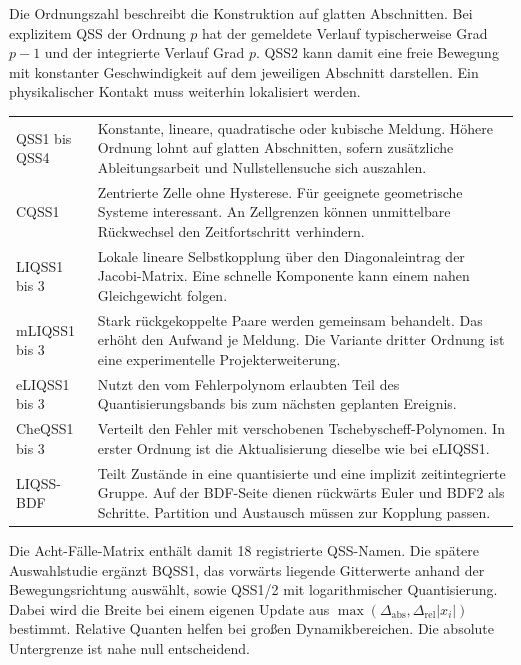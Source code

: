 Die Ordnungszahl beschreibt die Konstruktion auf glatten Abschnitten. Bei explizitem QSS der Ordnung \(p\) hat der gemeldete Verlauf typischerweise Grad \(p-1\) und der integrierte Verlauf Grad \(p\). QSS2 kann damit eine freie Bewegung mit konstanter Geschwindigkeit auf dem jeweiligen Abschnitt darstellen. Ein physikalischer Kontakt muss weiterhin lokalisiert werden.
{\tblstart\begin{tabularx}{\linewidth}{@{}P{28mm}Y@{}}\toprule
{}&\\\midrule
QSS1 bis QSS4&Konstante, lineare, quadratische oder kubische Meldung. Höhere Ordnung lohnt auf glatten Abschnitten, sofern zusätzliche Ableitungsarbeit und Nullstellensuche sich auszahlen.\\
CQSS1&Zentrierte Zelle ohne Hysterese. Für geeignete geometrische Systeme interessant. An Zellgrenzen können unmittelbare Rückwechsel den Zeitfortschritt verhindern.\\
LIQSS1 bis 3&Lokale lineare Selbstkopplung über den Diagonaleintrag der Jacobi-Matrix. Eine schnelle Komponente kann einem nahen Gleichgewicht folgen.\\
mLIQSS1 bis 3&Stark rückgekoppelte Paare werden gemeinsam behandelt. Das erhöht den Aufwand je Meldung. Die Variante dritter Ordnung ist eine experimentelle Projekterweiterung.\\
eLIQSS1 bis 3&Nutzt den vom Fehlerpolynom erlaubten Teil des Quantisierungsbands bis zum nächsten geplanten Ereignis.\\
CheQSS1 bis 3&Verteilt den Fehler mit verschobenen Tschebyscheff-Polynomen. In erster Ordnung ist die Aktualisierung dieselbe wie bei eLIQSS1.\\
LIQSS-BDF&Teilt Zustände in eine quantisierte und eine implizit zeitintegrierte Gruppe. Auf der BDF-Seite dienen rückwärts Euler und BDF2 als Schritte. Partition und Austausch müssen zur Kopplung passen.\\\bottomrule
\end{tabularx}\par}
Die Acht-Fälle-Matrix enthält damit 18 registrierte QSS-Namen. Die spätere Auswahlstudie ergänzt BQSS1, das vorwärts liegende Gitterwerte anhand der Bewegungsrichtung auswählt, sowie QSS1/2 mit logarithmischer Quantisierung. Dabei wird die Breite bei einem eigenen Update aus \(\max(\Delta_\mathrm{abs},\Delta_\mathrm{rel}|x_i|)\) bestimmt. Relative Quanten helfen bei großen Dynamikbereichen. Die absolute Untergrenze ist nahe null entscheidend.
